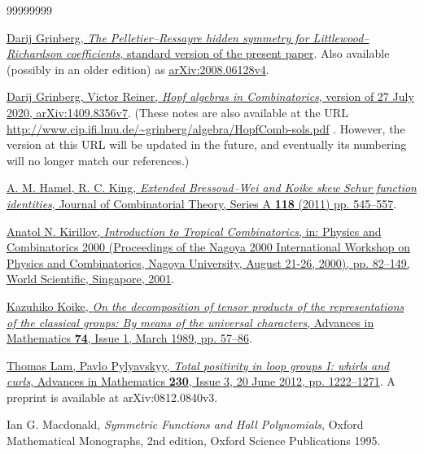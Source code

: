 \documentclass[numbers=enddot,12pt,final,onecolumn,notitlepage]{scrartcl}%
\theoremstyle{definition}
\newenvironment{verlong}{}{}
\begin{document}
\begin{thebibliography}{99999999}
\begin{verlong}


%
\href{http://www.cip.ifi.lmu.de/~grinberg/algebra/lrhspr.pdf}{Darij Grinberg,
\textit{The Pelletier--Ressayre hidden symmetry for Littlewood--Richardson
coefficients}, standard version of the present paper}. Also available
(possibly in an older edition) as
\href{http://arxiv.org/abs/2008.06128v4}{arXiv:2008.06128v4}.
\end{verlong}

\href{https://arxiv.org/abs/1409.8356v7}{Darij
Grinberg, Victor Reiner, \textit{Hopf algebras in Combinatorics}, version of
27 July 2020, arXiv:1409.8356v7}. \newline(These notes are also available at
the URL \url{http://www.cip.ifi.lmu.de/~grinberg/algebra/HopfComb-sols.pdf} .
However, the version at this URL will be updated in the future, and eventually
its numbering will no longer match our references.)

%
\href{https://doi.org/10.1016/j.jcta.2010.05.002}{A. M. Hamel, R. C. King,
\textit{Extended Bressoud--Wei and Koike skew Schur function identities},
Journal of Combinatorial Theory, Series A \textbf{118} (2011) pp. 545--557}.

%
\href{https://doi.org/10.1142/9789812810007_0005}{Anatol N. Kirillov,
\textit{Introduction to Tropical Combinatorics}, in: Physics and Combinatorics
2000 (Proceedings of the Nagoya 2000 International Workshop on Physics and
Combinatorics, Nagoya University, August 21-26, 2000), pp. 82--149, World
Scientific, Singapore, 2001}.

%
\href{https://doi.org/10.1016/0001-8708(89)90004-2}{Kazuhiko Koike, \textit{On
the decomposition of tensor products of the representations of the classical
groups: By means of the universal characters}, Advances in Mathematics
\textbf{74}, Issue 1, March 1989, pp. 57--86}.

%
\href{https://doi.org/10.1016/j.aim.2012.03.012}{Thomas Lam, Pavlo Pylyavskyy,
\textit{Total positivity in loop groups I: whirls and curls}, Advances in
Mathematics \textbf{230}, Issue 3, 20 June 2012, pp. 1222--1271}. A preprint
is available at arXiv:0812.0840v3.

Ian G. Macdonald, \textit{Symmetric Functions and
Hall Polynomials}, Oxford Mathematical Monographs, 2nd edition, Oxford Science
Publications 1995.


\end{thebibliography}
\end{document}
